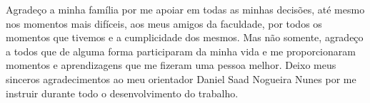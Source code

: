 Agradeço a minha família por me apoiar em todas as minhas decisões, até mesmo nos momentos mais difíceis, aos meus amigos da faculdade, por todos os momentos que tivemos e a cumplicidade dos mesmos. Mas não somente, agradeço a todos que de alguma forma participaram da minha vida e me proporcionaram momentos e aprendizagens que me fizeram uma pessoa melhor. Deixo meus sinceros agradecimentos ao meu orientador Daniel Saad Nogueira Nunes por me instruir durante todo o desenvolvimento do trabalho.